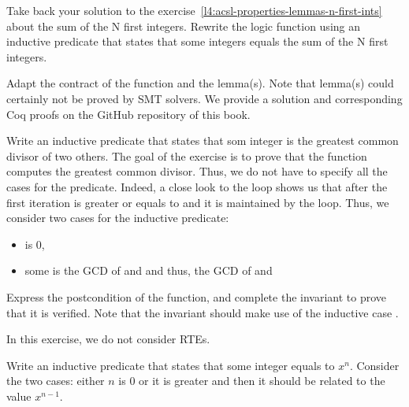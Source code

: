 



Take back your solution to the
exercise~\ref{l4:acsl-properties-lemmas-n-first-ints} about the sum of the N
first integers. Rewrite the logic function using an inductive predicate that
states that some integers equals the sum of the N first integers.




Adapt the contract of the function and the lemma(s). Note that lemma(s) could
certainly not be proved by SMT solvers. We provide a solution and corresponding
Coq proofs on the GitHub repository of this book.




Write an inductive predicate that states that som integer is the greatest common
divisor of two others. The goal of the exercise is to prove that the function
 computes the greatest common divisor. Thus, we do not have to
specify all the cases for the predicate. Indeed, a close look to the loop shows
us that after the first iteration  is greater or equals to
 and it is maintained by the loop. Thus, we consider two cases for
the inductive predicate:


\begin{itemize}
\item {} is 0,
\item some  is the GCD of  and  and
  thus, the GCD of  and 
\end{itemize}




Express the postcondition of the function, and complete the invariant to prove
that it is verified. Note that the invariant should make use of the inductive
case .





In this exercise, we do not consider RTEs.


Write an inductive predicate that states that some integer  equals
to $x^n$. Consider the two cases: either $n$ is 0 or it is greater and then it
should be related to the value $x^{n-1}$.




